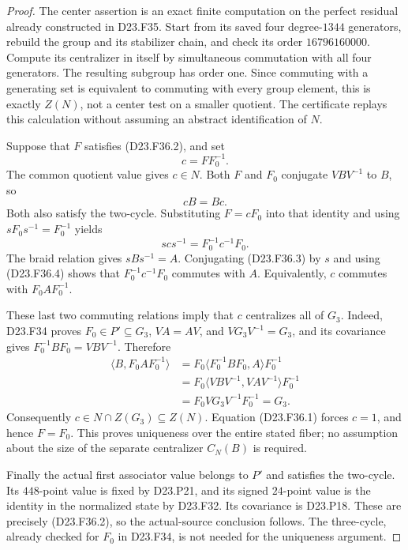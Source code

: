 \begin{proof}
The center assertion is an exact finite computation on the perfect
residual already constructed in D23.F35. Start from its saved four
degree-$1344$ generators, rebuild the group and its stabilizer chain,
and check its order $16796160000$. Compute its centralizer in itself
by simultaneous commutation with all four generators. The resulting
subgroup has order one. Since commuting with a generating set is
equivalent to commuting with every group element, this is exactly
$Z(N)$, not a center test on a smaller quotient. The certificate
replays this calculation without assuming an abstract
identification of $N$.

Suppose that $F$ satisfies (D23.F36.2), and set
\[
                              c=FF_0^{-1}.
\]
The common quotient value gives $c\in N$. Both $F$ and $F_0$
conjugate $VBV^{-1}$ to $B$, so
\[
                             cB=Bc.                       \tag{D23.F36.3}
\]
Both also satisfy the two-cycle. Substituting $F=cF_0$ into that
identity and using $sF_0s^{-1}=F_0^{-1}$ yields
\[
                         scs^{-1}=F_0^{-1}c^{-1}F_0.
                                                               \tag{D23.F36.4}
\]
The braid relation gives $sBs^{-1}=A$. Conjugating
(D23.F36.3) by $s$ and using (D23.F36.4) shows that
$F_0^{-1}c^{-1}F_0$ commutes with $A$. Equivalently,
$c$ commutes with $F_0AF_0^{-1}$.

These last two commuting relations imply that $c$ centralizes
all of $G_3$. Indeed, D23.F34 proves $F_0\in P'\subseteq G_3$,
$VA=AV$, and $VG_3V^{-1}=G_3$, and its covariance gives
$F_0^{-1}BF_0=VBV^{-1}$. Therefore
\[
 \begin{split}
 \langle B,F_0AF_0^{-1}\rangle
 &=F_0\langle F_0^{-1}BF_0,A\rangle F_0^{-1}\\
 &=F_0\langle VBV^{-1},VAV^{-1}\rangle F_0^{-1}\\
 &=F_0VG_3V^{-1}F_0^{-1}=G_3.
 \end{split}
\]
Consequently $c\in N\cap Z(G_3)\subseteq Z(N)$.
Equation (D23.F36.1) forces $c=1$, and hence $F=F_0$.
This proves uniqueness over the entire stated fiber; no assumption
about the size of the separate centralizer $C_N(B)$ is required.

Finally the actual first associator value belongs to $P'$ and
satisfies the two-cycle. Its $448$-point value is fixed by D23.P21,
and its signed $24$-point value is the identity in the normalized
state by D23.F32. Its covariance is D23.P18. These are precisely
(D23.F36.2), so the actual-source conclusion follows. The
three-cycle, already checked for $F_0$ in D23.F34, is not needed
for the uniqueness argument.
\end{proof}

